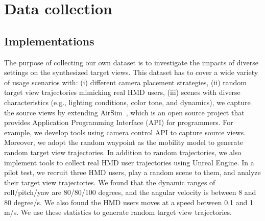 \section{Data collection} \label{sec:data_collection}
\subsection{Implementations}
The purpose of collecting our own dataset is to investigate the impacts of diverse settings on the synthesized target views.
This dataset has to cover a wide variety of usage scenarios with: (i) different camera placement strategies, (ii) random target view trajectories mimicking real HMD users, (iii) scenes with diverse characteristics (e.g., lighting conditions, color tone, and dynamics), we capture the source views by extending AirSim~\cite{airsim}, which is an open source project that provides Application Programming Interface (API) for programmers.
For example, we develop tools using camera control API to capture source views.
Moreover, we adopt the random waypoint as the mobility model to generate random target view trajectories.
In addition to random trajectories, we also implement tools to collect real HMD user trajectories using Unreal Engine.
In a pilot test, we recruit three HMD users, play a random scene to them, and analyze their target view trajectories.
We found that the dynamic ranges of roll/pitch/yaw are 80/80/100 degrees, and the angular velocity is between 8 and 80 degree/s.
We also found the HMD users moves at a speed between 0.1 and 1 m/s.
We use these statistics to generate random target view trajectories. 

